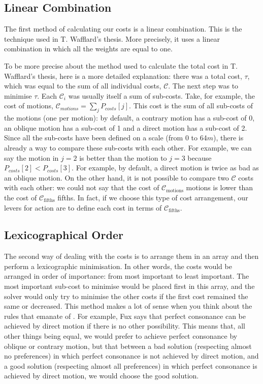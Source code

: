 \subsection*{Linear Combination}


The first method of calculating our costs is a linear combination. This is the technique used in T. Wafflard's thesis. More precisely, it uses a linear combination in which all the weights are equal to one.



To be more precise about the method used to calculate the total cost in T. Wafflard's thesis, here is a more detailed explanation: there was a total cost, $\tau$, which was equal to the sum of all individual costs, $\mathcal{C}$. The next step was to minimise $\tau$. Each $\mathcal{C}_i$ was usually itself a sum of sub-costs. Take, for example, the cost of motions, $\mathcal{C}_{motions} = \sum_j P_{costs}[j] $. This cost is the sum of all sub-costs of the motions (one per motion): by default, a contrary motion has a sub-cost of 0, an oblique motion has a sub-cost of 1 and a direct motion has a sub-cost of 2. Since all the sub-costs have been defined on a scale (from 0 to 64$m$), there is already a way to compare these sub-costs with each other. For example, we can say the motion in $j=2$ is better than the motion to $j=3$ because $P_{costs}[2] < P_{costs}[3]$. For example, by default, a direct motion is twice as bad as an oblique motion. On the other hand, it is not possible to compare two $\mathcal{C}$ costs with each other: we could not say that the cost of $\mathcal{C}_{\text{motions}}$ motions is lower than the cost of $\mathcal{C}_{\text{fifths}}$ fifths. In fact, if we choose this type of cost arrangement, our levers for action are to define each cost in terms of $\mathcal{C}_{\text{fifths}}$. 


\subsection*{Lexicographical Order}
The second way of dealing with the costs is to arrange them in an array and then perform a lexicographic minimisation. In other words, the costs would be arranged in order of importance: from most important to least important. The most important sub-cost to minimise would be placed first in this array, and the solver would only try to minimise the other costs if the first cost remained the same or decreased. This method makes a lot of sense when you think about the rules that emanate of \gap. For example, Fux says that perfect consonance can be achieved by direct motion if there is no other possibility. This means that, all other things being equal, we would prefer to achieve perfect consonance by oblique or contrary motion, but that between a bad solution (respecting almost no preferences) in which perfect consonance is not achieved by direct motion, and a good solution (respecting almost all preferences) in which perfect consonance is achieved by direct motion, we would choose the good solution. 

